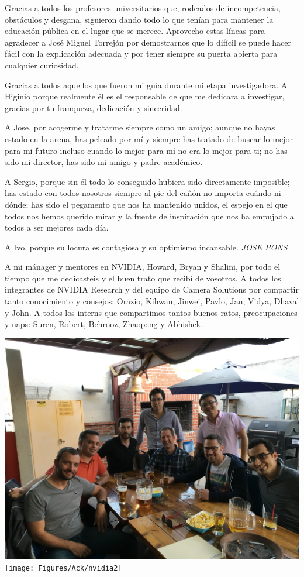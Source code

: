 Gracias a todos los profesores universitarios que, rodeados de incompetencia, obstáculos y desgana, siguieron dando todo lo que tenían para mantener la educación pública en el lugar que se merece. Aprovecho estas líneas para agradecer a José Miguel Torrejón por demostrarnos que lo difícil se puede hacer fácil con la explicación adecuada y por tener siempre su puerta abierta para cualquier curiosidad.

Gracias a todos aquellos que fueron mi guía durante mi etapa investigadora. A Higinio porque realmente él es el responsable de que me dedicara a investigar, gracias por tu franqueza, dedicación y sinceridad.

A Jose, por acogerme y tratarme siempre como un amigo; aunque no hayas estado en la arena, has peleado por mí y siempre has tratado de buscar lo mejor para mi futuro incluso cuando lo mejor para mí no era lo mejor para ti; no has sido mi director, has sido mi amigo y padre académico.

A Sergio, porque sin él todo lo conseguido hubiera sido directamente imposible; has estado con todos nosotros siempre al pie del cañón no importa cuándo ni dónde; has sido el pegamento que nos ha mantenido unidos, el espejo en el que todos nos hemos querido mirar y la fuente de inspiración que nos ha empujado a todos a ser mejores cada día.

A Ivo, porque su locura es contagiosa y su optimismo incansable. \emph{JOSE PONS}

A mi mánager y mentores en NVIDIA, Howard, Bryan y Shalini, por todo el tiempo que me dedicasteis y el buen trato que recibí de vosotros. A todos los integrantes de NVIDIA Research y del equipo de Camera Solutions por compartir tanto conocimiento y consejos: Orazio, Kihwan, Jinwei, Pavlo, Jan, Vidya, Dhaval y John. A todos los interns que compartimos tantos buenos ratos, preocupaciones y naps: Suren, Robert, Behrooz, Zhaopeng y Abhishek.

\begin{center}
\includegraphics[width=0.44\linewidth]{Figures/Ack/nvidia}
\texttt{[image: Figures/Ack/nvidia2]}
\end{center}

